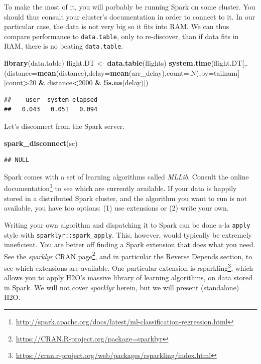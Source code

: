 \documentclass[]{book}
\newenvironment{Shaded}{\begin{snugshade}}{\end{snugshade}}
\newcommand{\DataTypeTok}[1]{\textcolor[rgb]{0.13,0.29,0.53}{#1}}
\newcommand{\DecValTok}[1]{\textcolor[rgb]{0.00,0.00,0.81}{#1}}
\newcommand{\KeywordTok}[1]{\textcolor[rgb]{0.13,0.29,0.53}{\textbf{#1}}}
\newcommand{\NormalTok}[1]{#1}
\newcommand{\OperatorTok}[1]{\textcolor[rgb]{0.81,0.36,0.00}{\textbf{#1}}}
\newcommand{\StringTok}[1]{\textcolor[rgb]{0.31,0.60,0.02}{#1}}
\renewcommand{\href}[2]{#2\footnote{\url{#1}}}
\theoremstyle{definition}
\theoremstyle{definition}
\theoremstyle{definition}
\theoremstyle{remark}
\begin{document}
To make the most of it, you will porbably be running Spark on some cluster.
You should thus consult your cluster's documentation in order to connect to it.
In our particular case, the data is not very big so it fits into RAM.
We can thus compare performance to \texttt{data.table}, only to re-discover, than if data fits in RAM, there is no beating \texttt{data.table}.

\begin{Shaded}
\begin{Highlighting}[]
\KeywordTok{library}\NormalTok{(data.table)}
\NormalTok{flight.DT <-}\StringTok{ }\KeywordTok{data.table}\NormalTok{(flights)}
\KeywordTok{system.time}\NormalTok{(flight.DT[,.(}\DataTypeTok{distance=}\KeywordTok{mean}\NormalTok{(distance),}\DataTypeTok{delay=}\KeywordTok{mean}\NormalTok{(arr_delay),}\DataTypeTok{count=}\NormalTok{.N),}\DataTypeTok{by=}\NormalTok{tailnum][count}\OperatorTok{>}\DecValTok{20} \OperatorTok{&}\StringTok{ }\NormalTok{distance}\OperatorTok{<}\DecValTok{2000} \OperatorTok{&}\StringTok{ }\OperatorTok{!}\KeywordTok{is.na}\NormalTok{(delay)])}
\end{Highlighting}
\end{Shaded}

\begin{verbatim}
##    user  system elapsed 
##   0.043   0.051   0.094
\end{verbatim}

Let's disconnect from the Spark server.

\begin{Shaded}
\begin{Highlighting}[]
\KeywordTok{spark_disconnect}\NormalTok{(sc)}
\end{Highlighting}
\end{Shaded}

\begin{verbatim}
## NULL
\end{verbatim}

Spark comes with a set of learning algorithms called \emph{MLLib}.
Consult the \href{http://spark.apache.org/docs/latest/ml-classification-regression.html}{online documentation} to see which are currently available.
If your data is happily stored in a distributed Spark cluster, and the algorithm you want to run is not available, you have too options:
(1) use extensions or (2) write your own.

Writing your own algorithm and dispatching it to Spark can be done a-la \texttt{apply} style with \texttt{sparklyr::spark\_apply}. This, however, would typically be extremely inneficient. You are better off finding a Spark extension that does what you need.
See the \emph{sparklyr} \href{https://CRAN.R-project.org/package=sparklyr}{CRAN page}, and in particular the Reverse Depends section, to see which extensions are available.
One particular extension is \href{https://cran.r-project.org/web/packages/rsparkling/index.html}{rsparkling}, which allows you to apply H2O's massive library of learning algorithms, on data stored in Spark.
We will not cover \emph{sparklyr} herein, but we will present (standalone) H2O.
\end{document}
